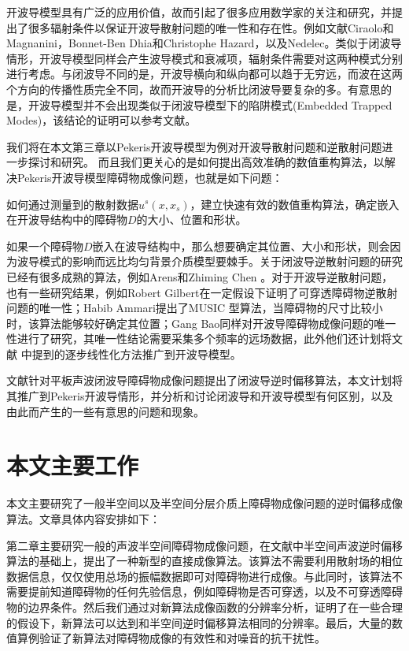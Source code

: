 开波导模型具有广泛的应用价值，故而引起了很多应用数学家的关注和研究，并提出了很多辐射条件以保证开波导散射问题的唯一性和存在性。例如文献Ciraolo和Magnanini\cite{Ciraolo2009A1,Ciraolo2009A2}，Bonnet-Ben
Dhia和Christophe Hazard\cite{Dhia2009DIFFRACTION}，以及Nedelec\cite{Jerez2012Asymptotics}。类似于闭波导情形，开波导模型同样会产生波导模式和衰减项，辐射条件需要对这两种模式分别进行考虑。与闭波导不同的是，开波导横向和纵向都可以趋于无穷远，而波在这两个方向的传播性质完全不同，故而开波导的分析比闭波导要复杂的多。有意思的是，开波导模型并不会出现类似于闭波导模型下的陷阱模式(Embedded Trapped Modes)，该结论的证明可以参考文献\cite{Littman1982Spectral,Weder1988Absence,Hazard2014On}。


我们将在本文第三章以Pekeris开波导模型为例对开波导散射问题和逆散射问题进一步探讨和研究。
而且我们更关心的是如何提出高效准确的数值重构算法，以解决Pekeris开波导模型障碍物成像问题，也就是如下问题：
\begin{question}
 如何通过测量到的散射数据$u^s(x,x_s)$，建立快速有效的数值重构算法，确定嵌入在开波导结构中的障碍物$D$的大小、位置和形状。
\end{question}

如果一个障碍物$D$嵌入在波导结构中，那么想要确定其位置、大小和形状，则会因为波导模式的影响而远比均匀背景介质模型要棘手。关于闭波导逆散射问题的研究已经有很多成熟的算法，例如Arens\cite{Arens2011Direct}和Zhiming Chen
\cite{ch_cw}。对于开波导逆散射问题，也有一些研究结果，例如Robert Gilbert\cite{Gilbert2007Inverse}在一定假设下证明了可穿透障碍物逆散射问题的唯一性；Habib Ammari\cite{Ammari2005Reconstruction}提出了MUSIC 型算法，当障碍物的尺寸比较小时，该算法能够较好确定其位置；Gang Bao\cite{Bao2013Reconstruction}同样对开波导障碍物成像问题的唯一性进行了研究，其唯一性结论需要采集多个频率的远场数据，此外他们还计划将文献
\cite{Bao2005Inverse,Bao2010Error,Bao2011An}中提到的逐步线性化方法推广到开波导模型。

文献\cite{ch_cw}针对平板声波闭波导障碍物成像问题提出了闭波导逆时偏移算法，本文计划将其推广到Pekeris开波导情形，并分析和讨论闭波导和开波导模型有何区别，以及由此而产生的一些有意思的问题和现象。

\newpage
\section{本文主要工作}

本文主要研究了一般半空间以及半空间分层介质上障碍物成像问题的逆时偏移成像算法。文章具体内容安排如下：

第二章主要研究一般的声波半空间障碍物成像问题，在文献\cite{ch_ha}中半空间声波逆时偏移算法的基础上，提出了一种新型的直接成像算法。该算法不需要利用散射场的相位数据信息，仅仅使用总场的振幅数据即可对障碍物进行成像。与此同时，该算法不需要提前知道障碍物的任何先验信息，例如障碍物是否可穿透，以及不可穿透障碍物的边界条件。然后我们通过对新算法成像函数的分辨率分析，证明了在一些合理的假设下，新算法可以达到和半空间逆时偏移算法相同的分辨率。最后，大量的数值算例验证了新算法对障碍物成像的有效性和对噪音的抗干扰性。


